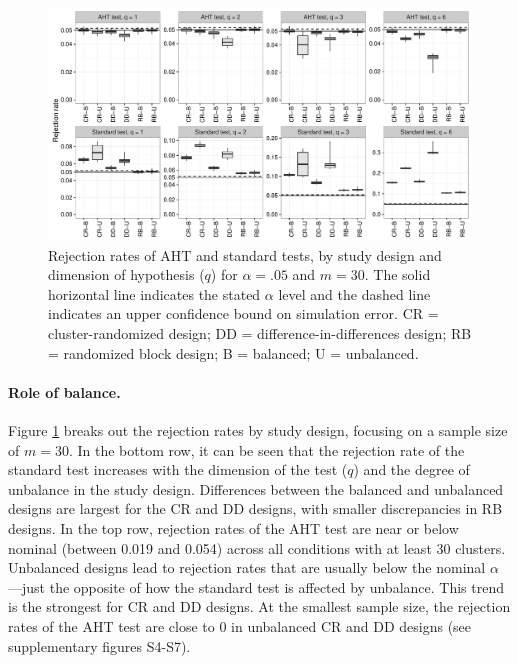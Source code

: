 \documentclass[12pt]{article}\usepackage[]{graphicx}\usepackage[]{color}
\newenvironment{knitrout}{}{} %
\begin{document}
\begin{knitrout}
\color{fgcolor}\begin{figure}

{\centering \includegraphics[width=\linewidth]{CR_fig/balance-1} 

}

\caption[Rejection rates of AHT and standard tests, by study design and dimension of hypothesis ($q$) for $\alpha = .05$ and $m = 30$]{Rejection rates of AHT and standard tests, by study design and dimension of hypothesis ($q$) for $\alpha = .05$ and $m = 30$. The solid horizontal line indicates the stated $\alpha$ level and the dashed line indicates an upper confidence bound on simulation error. CR = cluster-randomized design; DD = difference-in-differences design; RB = randomized block design; B = balanced; U = unbalanced.}\label{fig:balance}
\end{figure}


\end{knitrout}

\paragraph{Role of balance.} Figure \ref{fig:balance} breaks out the rejection rates by study design, focusing on a sample size of $m = 30$. 
In the bottom row, it can be seen that the rejection rate of the standard test increases with the dimension of the test ($q$) and the degree of unbalance in the study design.
Differences between the balanced and unbalanced designs are largest for the CR and DD designs, with smaller discrepancies in RB designs.
In the top row, rejection rates of the AHT test are near or below nominal (between 0.019 and 0.054) across all conditions with at least 30 clusters.
Unbalanced designs lead to rejection rates that are usually below the nominal $\alpha$---just the opposite of how the standard test is affected by unbalance. 
This trend is the strongest for CR and DD designs. 
At the smallest sample size, the rejection rates of the AHT test are close to 0 in unbalanced CR and DD designs (see supplementary figures S4-S7). 
\end{document}
